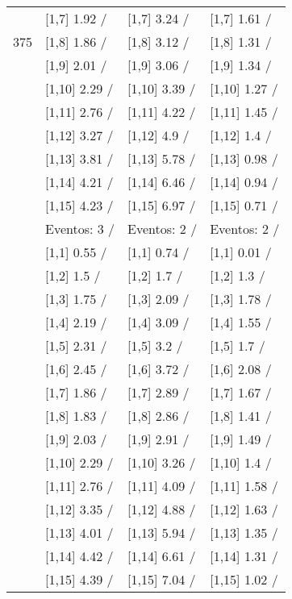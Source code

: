 \begin{table}
\begin{tabular}[t]{llll}
 & {}[1,7] 1.92  / & {}[1,7] 3.24  / & {}[1,7] 1.61  /\\
375 & {}[1,8] 1.86  / & {}[1,8] 3.12  / & {}[1,8] 1.31  /\\
\addlinespace
 & {}[1,9] 2.01  / & {}[1,9] 3.06  / & {}[1,9] 1.34  /\\
 & {}[1,10] 2.29  / & {}[1,10] 3.39  / & {}[1,10] 1.27  /\\
 & {}[1,11] 2.76  / & {}[1,11] 4.22  / & {}[1,11] 1.45  /\\
 & {}[1,12] 3.27  / & {}[1,12] 4.9  / & {}[1,12] 1.4  /\\
 & {}[1,13] 3.81  / & {}[1,13] 5.78  / & {}[1,13] 0.98  /\\
\addlinespace
 & {}[1,14] 4.21  / & {}[1,14] 6.46  / & {}[1,14] 0.94  /\\
 & {}[1,15] 4.23  / & {}[1,15] 6.97  / & {}[1,15] 0.71  /\\
 & Eventos:  3 / & Eventos:  2 / & Eventos:  2 /\\
 & {}[1,1] 0.55  / & {}[1,1] 0.74  / & {}[1,1] 0.01  /\\
 & {}[1,2] 1.5  / & {}[1,2] 1.7  / & {}[1,2] 1.3  /\\
\addlinespace
 & {}[1,3] 1.75  / & {}[1,3] 2.09  / & {}[1,3] 1.78  /\\
 & {}[1,4] 2.19  / & {}[1,4] 3.09  / & {}[1,4] 1.55  /\\
 & {}[1,5] 2.31  / & {}[1,5] 3.2  / & {}[1,5] 1.7  /\\
 & {}[1,6] 2.45  / & {}[1,6] 3.72  / & {}[1,6] 2.08  /\\
 & {}[1,7] 1.86  / & {}[1,7] 2.89  / & {}[1,7] 1.67  /\\
\addlinespace
500 & {}[1,8] 1.83  / & {}[1,8] 2.86  / & {}[1,8] 1.41  /\\
 & {}[1,9] 2.03  / & {}[1,9] 2.91  / & {}[1,9] 1.49  /\\
 & {}[1,10] 2.29  / & {}[1,10] 3.26  / & {}[1,10] 1.4  /\\
 & {}[1,11] 2.76  / & {}[1,11] 4.09  / & {}[1,11] 1.58  /\\
 & {}[1,12] 3.35  / & {}[1,12] 4.88  / & {}[1,12] 1.63  /\\
\addlinespace
 & {}[1,13] 4.01  / & {}[1,13] 5.94  / & {}[1,13] 1.35  /\\
 & {}[1,14] 4.42  / & {}[1,14] 6.61  / & {}[1,14] 1.31  /\\
 & {}[1,15] 4.39  / & {}[1,15] 7.04  / & {}[1,15] 1.02  /\\
\bottomrule
\end{tabular}
\end{table}
